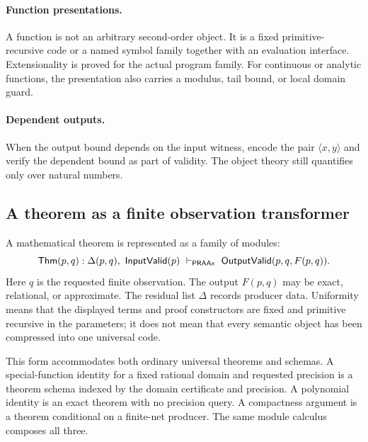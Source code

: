 \paragraph{Function presentations.}
A function is not an arbitrary second-order object.  It is a fixed
primitive-recursive code or a named symbol family together with an evaluation
interface.  Extensionality is proved for the actual program family.  For
continuous or analytic functions, the presentation also carries a modulus,
tail bound, or local domain guard.

\paragraph{Dependent outputs.}
When the output bound depends on the input witness, encode the pair
\(\langle x,y\rangle\) and verify the dependent bound as part of validity.
The object theory still quantifies only over natural numbers.

\subsection{A theorem as a finite observation transformer}

A mathematical theorem is represented as a family of modules:
\[
  \mathsf{Thm}(p,q):
  \Delta(p,q),\ \mathsf{InputValid}(p)
  \ \vdash_{\mathsf{PRAAx}}\
  \mathsf{OutputValid}(p,q,F(p,q)).
\]
Here \(q\) is the requested finite observation.  The output \(F(p,q)\) may be
exact, relational, or approximate.  The residual list \(\Delta\) records
producer data.  Uniformity means that the displayed terms and proof
constructors are fixed and primitive recursive in the parameters; it does not
mean that every semantic object has been compressed into one universal code.

This form accommodates both ordinary universal theorems and schemas.  A
special-function identity for a fixed rational domain and requested precision
is a theorem schema indexed by the domain certificate and precision.  A
polynomial identity is an exact theorem with no precision query.  A compactness
argument is a theorem conditional on a finite-net producer.  The same module
calculus composes all three.
